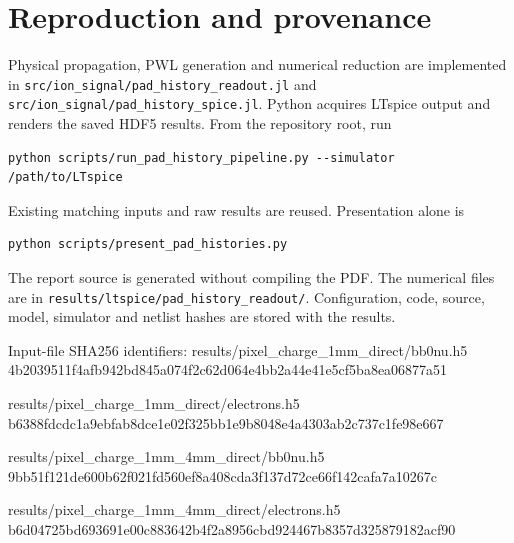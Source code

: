 \documentclass[11pt,a4paper]{article}
\begin{document}
\section{Reproduction and provenance}
Physical propagation, PWL generation and numerical reduction are implemented in
\texttt{src/ion\_signal/pad\_history\_readout.jl} and
\texttt{src/ion\_signal/pad\_history\_spice.jl}. Python acquires LTspice output and
renders the saved HDF5 results. From the repository root, run
\begin{verbatim}
python scripts/run_pad_history_pipeline.py --simulator /path/to/LTspice
\end{verbatim}
Existing matching inputs and raw results are reused. Presentation alone is
\begin{verbatim}
python scripts/present_pad_histories.py
\end{verbatim}
The report source is generated without compiling the PDF. The numerical files
are in \texttt{results/ltspice/pad\_history\_readout/}. Configuration, code, source,
model, simulator and netlist hashes are stored with the results.

Input-file SHA256 identifiers:
\small
\noindent results/pixel\_charge\_1mm\_direct/bb0nu.h5\\{\ttfamily\scriptsize 4b2039511f4afb942bd845a074f2c62d064e4bb2a44e41e5cf5ba8ea06877a51}\par
\noindent results/pixel\_charge\_1mm\_direct/electrons.h5\\{\ttfamily\scriptsize b6388fdcdc1a9ebfab8dce1e02f325bb1e9b8048e4a4303ab2c737c1fe98e667}\par
\noindent results/pixel\_charge\_1mm\_4mm\_direct/bb0nu.h5\\{\ttfamily\scriptsize 9bb51f121de600b62f021fd560ef8a408cda3f137d72ce66f142cafa7a10267c}\par
\noindent results/pixel\_charge\_1mm\_4mm\_direct/electrons.h5\\{\ttfamily\scriptsize b6d04725bd693691e00c883642b4f2a8956cbd924467b8357d325879182acf90}\par
\end{document}

